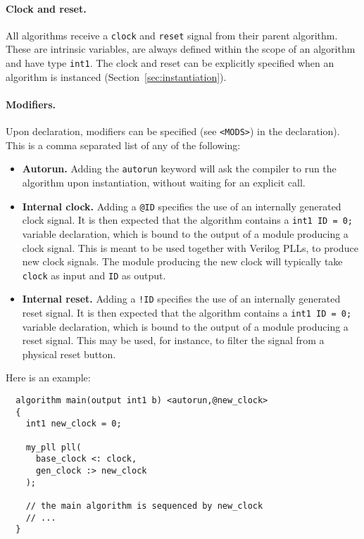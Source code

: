 \documentclass[a4]{article}
\newcommand\verilog{Verilog}
\begin{document}

\paragraph{Clock and reset.}

All algorithms receive a \texttt{clock} and \texttt{reset} signal from their
parent algorithm. These are intrinsic variables, are always defined within
the scope of an algorithm and have type \texttt{int1}. The clock and reset
can be explicitly specified when an algorithm is instanced (Section~\ref{sec:instantiation}).


\paragraph{Modifiers.}

Upon declaration, modifiers can be specified (see \texttt{<MODS>}) in the declaration). This is a comma separated list of any of the following:

\begin{itemize}
	\item \textbf{Autorun.} Adding the \texttt{autorun} keyword will ask the compiler to run the algorithm upon instantiation, without waiting for an explicit call.
	\item \textbf{Internal clock.} Adding a \texttt{@ID} specifies the use of an internally generated clock signal. It is then expected that the algorithm contains a \texttt{int1 ID = 0;} variable declaration, which is bound to the output of a module producing a clock signal. This is meant to be used together with \verilog{} PLLs, to produce new clock signals. The module producing the new clock will typically take \texttt{clock} as input and \texttt{ID}
	as output.
	\item \textbf{Internal reset.} Adding a \texttt{!ID} specifies the use of an internally generated reset signal. It is then expected that the algorithm contains a \texttt{int1 ID = 0;} variable declaration, which is bound to the output of a module producing a reset signal. This may be used, for instance, to filter the signal from a physical reset button.
\end{itemize}

Here is an example:
\begin{verbatim}
  algorithm main(output int1 b) <autorun,@new_clock>
  {
    int1 new_clock = 0;

    my_pll pll(
      base_clock <: clock,
      gen_clock :> new_clock
    );

    // the main algorithm is sequenced by new_clock
    // ...
  }
\end{verbatim}
\end{document}

